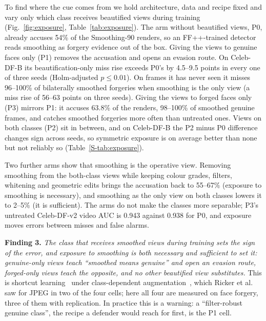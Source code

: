 \documentclass[conference]{IEEEtran}
\begin{document}
To find where the cue comes from we hold architecture, data and recipe fixed and vary only which class receives beautified
views during training (Fig.~\ref{fig:exposure}, Table~\ref{tab:exposure}). The arm without beautified views, P0, already
accuses 54\% of the Smoothing-90 renders, so an FF++-trained detector reads smoothing as forgery evidence out of the box.
Giving the views to genuine faces only (P1) removes the accusation and opens an evasion route. On Celeb-DF-B its
beautification-only miss rise exceeds P0's by 4.5--9.5 points in every one of three seeds (Holm-adjusted $p\le0.01$).
On frames it has never seen it misses 96--100\% of bilaterally smoothed forgeries when smoothing is the only view
(a miss rise of 56--63 points on three seeds).
Giving the views to forged faces only (P3) mirrors P1: it accuses 63.8\% of the renders, 98--100\% of smoothed genuine
frames, and catches smoothed forgeries more often than untreated ones.
Views on both classes (P2) sit in between, and on Celeb-DF-B the P2 minus P0 difference changes sign across seeds, so
symmetric exposure is on average better than none but not reliably so (Table~\ref{S-tab:exposure}).

Two further arms show that smoothing is the operative view. Removing smoothing from the both-class views while keeping colour
grades, filters, whitening and geometric edits brings the accusation back to 55--67\%
(exposure to smoothing is necessary), and smoothing as the only view on both classes lowers it to 2--5\%
(it is sufficient). The arms do not make the classes more separable; P3's untreated Celeb-DF-v2 video AUC is 0.943 against
0.938 for P0, and exposure moves errors between misses and false alarms.

\textbf{Finding 3.} \emph{The class that receives smoothed views during training sets the sign of the error, and exposure
to smoothing is both necessary and sufficient to set it: genuine-only views teach ``smoothed means genuine'' and open an
evasion route, forged-only views teach the opposite, and no other beautified view substitutes.} This is shortcut
learning~\cite{geirhos2020} under class-dependent augmentation~\cite{balestriero2022}, which Ricker et
al.~\cite{ricker2026biasid} saw for JPEG in two of the four cells; here all four are measured on face forgery, three of
them with replication. In practice this is a warning: a ``filter-robust genuine class'', the recipe a defender would
reach for first, is the P1 cell.
\end{document}
